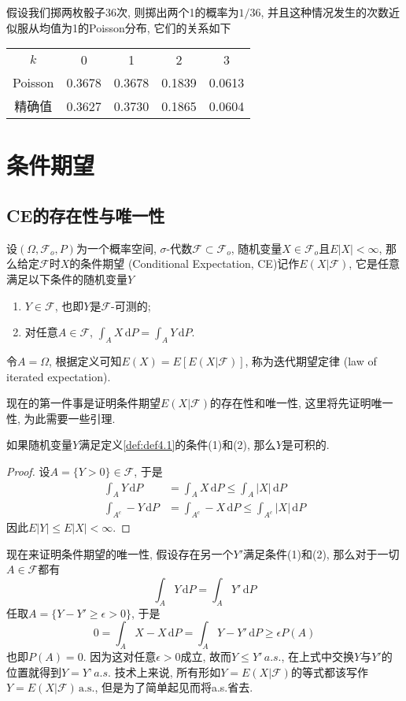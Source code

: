\documentclass[cn, 12pt, math=mtpro2, bibstyle=apa, blue, twocol]{elegantbook}
\newcommand{\F}{\mathcal{F}}
\begin{document}
\begin{example}
假设我们掷两枚骰子36次, 则掷出两个1的概率为$1/36$, 并且这种情况发生的次数近似服从均值为1的Poisson分布, 它们的关系如下
\begin{table}[htbp!]
\centering
\begin{tabular}{ccccc}
$k$      & 0      & 1      & 2      & 3      \\
Poisson & 0.3678 & 0.3678 & 0.1839 & 0.0613 \\
精确值     & 0.3627 & 0.3730 & 0.1865 & 0.0604
\end{tabular}
\end{table}
\end{example}

\chapter{条件期望}
\section{CE的存在性与唯一性}
\begin{definition}\label{def:def4.1}
设$(\Omega,\F_o,P)$为一个概率空间, $\sigma$-代数$\F\subset \F_o$, 随机变量$X\in\F_o$且$E|X|<\infty$, 那么给定$\F$时$X$的条件期望 (Conditional Expectation, CE)记作$E(X|\F)$, 它是任意满足以下条件的随机变量$Y$
\begin{enumerate}[label=(\arabic*)]
  \item $Y\in\F$, 也即$Y$是$\F$-可测的;
  \item 对任意$A\in\F$, $\int_AX\,\text{d}P=\int_AY\,\text{d}P$.
\end{enumerate}
\end{definition}
\begin{remark}
令$A=\Omega$, 根据定义可知$E(X)=E[E(X|\F)]$, 称为迭代期望定律 (law of iterated expectation).
\end{remark}

现在的第一件事是证明条件期望$E(X|\F)$的存在性和唯一性, 这里将先证明唯一性, 为此需要一些引理.
\begin{lemma}
如果随机变量$Y$满足定义\ref{def:def4.1}的条件(1)和(2), 那么$Y$是可积的.
\end{lemma}
\begin{proof}
  设$A=\{Y>0\}\in\F$, 于是
  \begin{align*}
  \int_AY\,\text{d}P&=\int_AX\,\text{d}P\leq\int_A|X|\,\text{d}P \\
  \int_{A^c}-Y\,\text{d}P&=\int_{A^c}-X\,\text{d}P\leq\int_{A^c}|X|\,\text{d}P
  \end{align*}
  因此$E|Y|\leq E|X|<\infty$.
\end{proof}
现在来证明条件期望的唯一性, 假设存在另一个$Y'$满足条件(1)和(2), 那么对于一切$A\in\F$都有
$$\int_AY\,\text{d}P=\int_AY'\,\text{d}P$$
任取$A=\{Y-Y'\geq\epsilon>0\}$, 于是
$$0=\int_A X-X\,\text{d}P=\int_AY-Y'\,\text{d}P\geq\epsilon P(A)$$
也即$P(A)=0$. 因为这对任意$\epsilon>0$成立, 故而$Y\leq Y'\,a.s.$, 在上式中交换$Y$与$Y'$的位置就得到$Y=Y’\,a.s.$ 技术上来说, 所有形如$Y=E(X|\F)$的等式都该写作$Y=E(X|\F)\,\text{a.s.}$, 但是为了简单起见而将a.s.省去.
\end{document}
